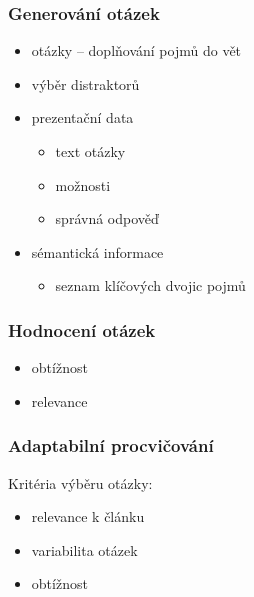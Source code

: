 \documentclass[xcolor=svgnames]{beamer}
\begin{document}
\begin{frame}
\frametitle{Generování otázek}
\begin{itemize}
\item otázky -- doplňování pojmů do vět
\item výběr distraktorů
\item prezentační data
  \begin{itemize}
  \item text otázky
  \item možnosti
  \item správná odpověď
  \end{itemize}
\item sémantická informace
  \begin{itemize}
  \item seznam klíčových dvojic pojmů
  \end{itemize}
\end{itemize}
\end{frame}
\begin{frame}
\frametitle{Hodnocení otázek}
\begin{itemize}
\item obtížnost
\item relevance
\end{itemize}
\end{frame}
\begin{frame}
\frametitle{Adaptabilní procvičování}
Kritéria výběru otázky:
\begin{itemize}
\item relevance k článku
\item variabilita otázek
\item obtížnost
\end{itemize}
\end{frame}
\end{document}
